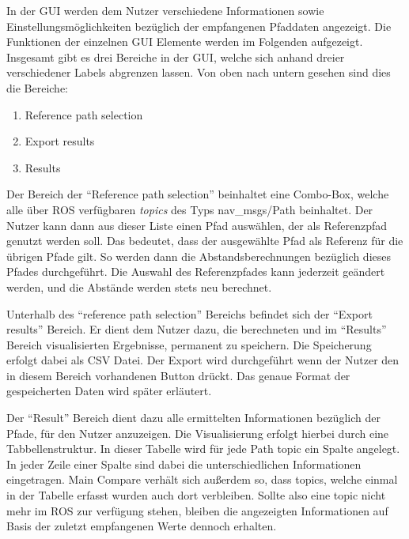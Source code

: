 In der GUI werden dem Nutzer verschiedene Informationen sowie
Einstellungsmöglichkeiten bezüglich der
empfangenen Pfaddaten angezeigt. Die Funktionen der einzelnen GUI Elemente
werden im Folgenden aufgezeigt.
Insgesamt gibt es drei Bereiche in der GUI, welche sich anhand dreier
verschiedener Labels abgrenzen lassen. Von oben nach untern gesehen sind
dies die Bereiche:

\begin{enumerate}
  \item Reference path selection
  \item Export results
  \item Results
\end{enumerate}


Der Bereich der ``Reference path selection'' beinhaltet eine Combo-Box, welche
alle über ROS verfügbaren \textit{topics} des Typs nav\_msgs/Path beinhaltet.
Der Nutzer kann dann aus dieser Liste einen Pfad auswählen, der als
Referenzpfad genutzt werden soll. Das bedeutet, dass der ausgewählte Pfad als
Referenz für die übrigen Pfade gilt. So werden dann die Abstandsberechnungen
bezüglich dieses Pfades durchgeführt. Die Auswahl des Referenzpfades kann
jederzeit geändert werden, und die Abstände werden stets neu berechnet.

Unterhalb des ``reference path selection'' Bereichs befindet sich der ``Export
results'' Bereich. Er dient dem Nutzer dazu, die berechneten und
im ``Results'' Bereich visualisierten Ergebnisse, permanent zu speichern.
Die Speicherung erfolgt dabei als \gls{CSV} Datei. Der Export wird durchgeführt
wenn der Nutzer den in diesem Bereich vorhandenen Button drückt. 
Das genaue Format der gespeicherten Daten wird später erläutert.

Der ``Result'' Bereich dient dazu alle ermittelten Informationen bezüglich der
Pfade, für den Nutzer anzuzeigen. Die Visualisierung erfolgt hierbei durch eine
Tabbellenstruktur. In dieser Tabelle wird für jede Path topic ein Spalte
angelegt.
In jeder Zeile einer Spalte sind dabei die unterschiedlichen
Informationen eingetragen.
Main Compare verhält sich außerdem so, dass topics, welche einmal in
der Tabelle erfasst wurden auch dort verbleiben. Sollte also eine topic nicht
mehr im ROS zur verfügung stehen, bleiben die angezeigten Informationen auf
Basis der zuletzt empfangenen Werte dennoch erhalten. 

